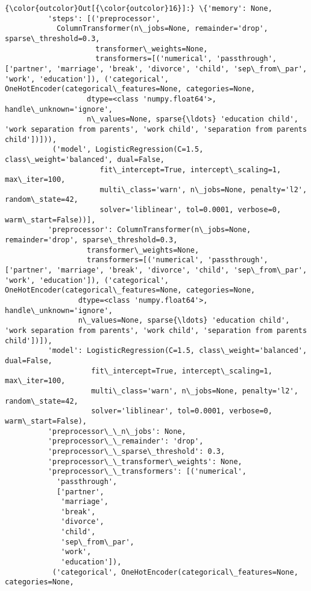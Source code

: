 \documentclass[11pt]{article}
\begin{document}
\begin{Verbatim}[commandchars=\\\{\}]
{\color{outcolor}Out[{\color{outcolor}16}]:} \{'memory': None,
          'steps': [('preprocessor',
            ColumnTransformer(n\_jobs=None, remainder='drop', sparse\_threshold=0.3,
                     transformer\_weights=None,
                     transformers=[('numerical', 'passthrough', ['partner', 'marriage', 'break', 'divorce', 'child', 'sep\_from\_par', 'work', 'education']), ('categorical', OneHotEncoder(categorical\_features=None, categories=None,
                   dtype=<class 'numpy.float64'>, handle\_unknown='ignore',
                   n\_values=None, sparse{\ldots} 'education child', 'work separation from parents', 'work child', 'separation from parents child'])])),
           ('model', LogisticRegression(C=1.5, class\_weight='balanced', dual=False,
                      fit\_intercept=True, intercept\_scaling=1, max\_iter=100,
                      multi\_class='warn', n\_jobs=None, penalty='l2', random\_state=42,
                      solver='liblinear', tol=0.0001, verbose=0, warm\_start=False))],
          'preprocessor': ColumnTransformer(n\_jobs=None, remainder='drop', sparse\_threshold=0.3,
                   transformer\_weights=None,
                   transformers=[('numerical', 'passthrough', ['partner', 'marriage', 'break', 'divorce', 'child', 'sep\_from\_par', 'work', 'education']), ('categorical', OneHotEncoder(categorical\_features=None, categories=None,
                 dtype=<class 'numpy.float64'>, handle\_unknown='ignore',
                 n\_values=None, sparse{\ldots} 'education child', 'work separation from parents', 'work child', 'separation from parents child'])]),
          'model': LogisticRegression(C=1.5, class\_weight='balanced', dual=False,
                    fit\_intercept=True, intercept\_scaling=1, max\_iter=100,
                    multi\_class='warn', n\_jobs=None, penalty='l2', random\_state=42,
                    solver='liblinear', tol=0.0001, verbose=0, warm\_start=False),
          'preprocessor\_\_n\_jobs': None,
          'preprocessor\_\_remainder': 'drop',
          'preprocessor\_\_sparse\_threshold': 0.3,
          'preprocessor\_\_transformer\_weights': None,
          'preprocessor\_\_transformers': [('numerical',
            'passthrough',
            ['partner',
             'marriage',
             'break',
             'divorce',
             'child',
             'sep\_from\_par',
             'work',
             'education']),
           ('categorical', OneHotEncoder(categorical\_features=None, categories=None,

\end{Verbatim}
\end{document}
